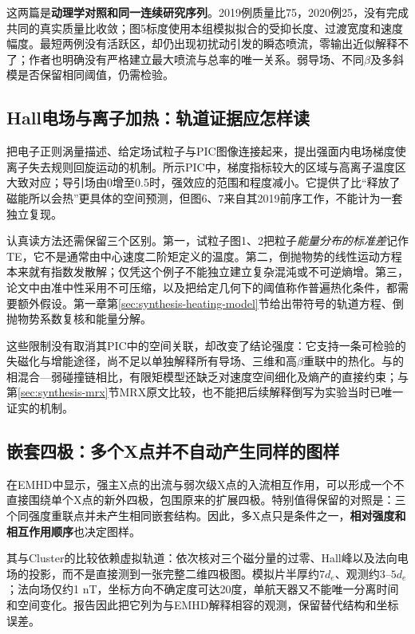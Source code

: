 这两篇是\textbf{动理学对照和同一连续研究序列}。2019例质量比75，2020例25，没有完成共同的真实质量比收敛；图5标度使用本组模拟拟合的受抑长度、过渡宽度和速度幅度。最短两例没有活跃区，却仍出现初扰动引发的瞬态喷流，零输出近似解释不了；作者也明确没有严格建立最大喷流与总率的唯一关系。弱导场、不同$\beta$及多斜模是否保留相同阈值，仍需检验。

\subsection{Hall电场与离子加热：轨道证据应怎样读}\label{sec:synthesis-heating}
\citet{L272}把电子正则涡量描述、给定场试粒子与PIC图像连接起来，提出强面内电场梯度使离子失去规则回旋运动的机制。所示PIC中，梯度指标较大的区域与高离子温度区大致对应；导引场由0增至0.5时，强效应的范围和程度减小。它提供了比“释放了磁能所以会热”更具体的空间预测，但图6、7来自其2019前序工作，不能计为一套独立复现。

认真读方法还需保留三个区别。第一，试粒子图1、2把粒子\emph{能量分布的标准差}记作TE，它不是通常由中心速度二阶矩定义的温度。第二，倒抛物势的线性运动方程本来就有指数发散解；仅凭这个例子不能独立建立复杂混沌或不可逆熵增。第三，论文中由准中性采用不可压缩，以及把给定几何下的阈值称作普遍热化条件，都需要额外假设。第一章第\ref{sec:synthesis-heating-model}节给出带符号的轨道方程、倒抛物势系数复核和能量分解。

这些限制没有取消其PIC中的空间关联，却改变了结论强度：它支持一条可检验的失磁化与增能途径，尚不足以单独解释所有导场、三维和高$\beta$重联中的热化。与\citet{E512}的相混合—弱碰撞链相比，有限矩模型还缺乏对速度空间细化及熵产的直接约束；与第\ref{sec:synthesis-mrx}节MRX原文比较，也不能把后续解释倒写为实验当时已唯一证实的机制。

\subsection{嵌套四极：多个X点并不自动产生同样的图样}\label{sec:synthesis-nested}
\citet{L213}在EMHD中显示，强主X点的出流与弱次级X点的入流相互作用，可以形成一个不直接围绕单个X点的新外四极，包围原来的扩展四极。特别值得保留的对照是：三个同强度重联点并未产生相同嵌套结构。因此，多X点只是条件之一，\textbf{相对强度和相互作用顺序}也决定图样。

其与Cluster的比较依赖虚拟轨道：依次核对三个磁分量的过零、Hall峰以及法向电场的投影，而不是直接测到一张完整二维四极图。模拟片半厚约$7d_e$、观测约$3$--$5d_e$；法向场仅约1 nT，坐标方向不确定度可达20度，单航天器又不能唯一分离时间和空间变化。报告因此把它列为与EMHD解释相容的观测，保留替代结构和坐标误差。


